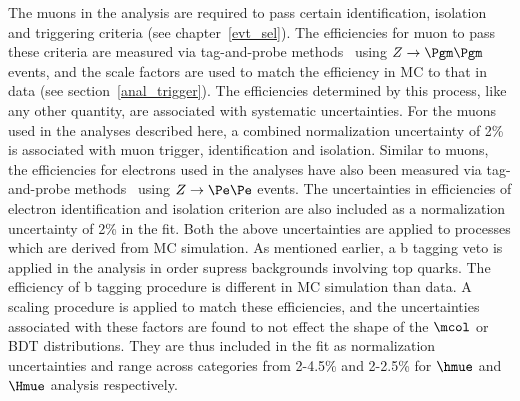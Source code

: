 The muons in the analysis are required to pass certain identification, isolation and triggering criteria (see chapter~\ref{evt_sel}). The efficiencies for muon to pass these criteria are measured via tag-and-probe methods~\cite{muon_recon2018} using $Z\rightarrow\Pgm\Pgm$ events, and the scale factors are used to match the efficiency in MC to that in data (see section~\ref{anal_trigger}). The efficiencies determined by this process, like any other quantity, are associated with systematic  uncertainties. For the muons used in the analyses described here, a combined normalization uncertainty of 2\% is associated with muon trigger, identification and isolation. Similar to muons, the efficiencies for electrons used in the analyses have also been measured via tag-and-probe methods~\cite{e_recon} using $Z\rightarrow\Pe\Pe$ events. The uncertainties in efficiencies  of electron identification and isolation criterion are also included as a normalization uncertainty of 2\% in the fit. Both the above uncertainties are applied to processes which are derived from MC simulation. As mentioned earlier, a b tagging veto is applied in the analysis in order supress backgrounds involving top quarks. The efficiency of b tagging procedure is different in MC simulation than data. A scaling procedure is applied to match these efficiencies, and the uncertainties associated with these factors are found to not effect the shape of the $\mcol$ or BDT distributions. They are thus included in the fit as normalization uncertainties and range across categories from 2-4.5\% and 2-2.5\% for $\hmue$ and $\Hmue$ analysis respectively.

